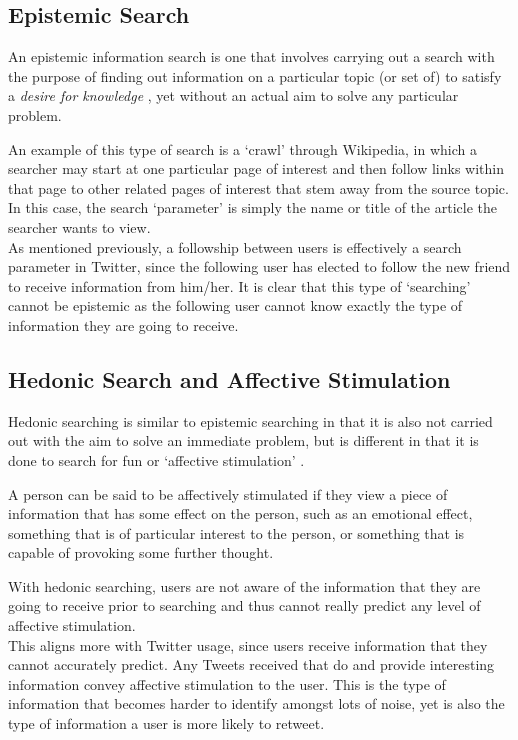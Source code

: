 \subsection{Epistemic Search}
An epistemic information search is one that involves carrying out a search with the purpose of finding out information on a particular topic (or set of) to satisfy a \textit{desire for knowledge} \cite{xu10}, yet without an actual aim to solve any particular problem.

An example of this type of search is a `crawl' through Wikipedia, in which a searcher may start at one particular page of interest and then follow links within that page to other related pages of interest that stem away from the source topic. In this case, the search `parameter' is simply the name or title of the article the searcher wants to view.\\
As mentioned previously, a followship between users is effectively a search parameter in Twitter, since the following user has elected to follow the new friend to receive information from him/her. It is clear that this type of `searching' cannot be epistemic as the following user cannot know exactly the type of information they are going to receive.

\subsection{Hedonic Search and Affective Stimulation}
Hedonic searching is similar to epistemic searching in that it is also not carried out with the aim to solve an immediate problem, but is different in that it is done to search for fun or `affective stimulation' \cite{xu10}.

A person can be said to be affectively stimulated if they view a piece of information that has some effect on the person, such as an emotional effect, something that is of particular interest to the person, or something that is capable of provoking some further thought.

With hedonic searching, users are not aware of the information that they are going to receive prior to searching and thus cannot really predict any level of affective stimulation.\\
This aligns more with Twitter usage, since users receive information that they cannot accurately predict. Any Tweets received that do and provide interesting information convey affective stimulation to the user. This is the type of information that becomes harder to identify amongst lots of noise, yet is also the type of information a user is more likely to retweet.

